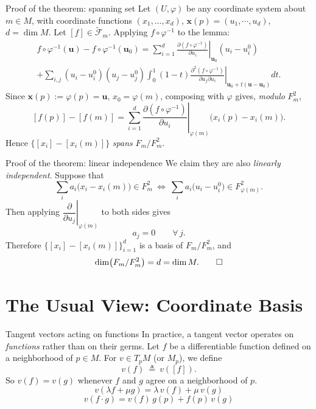 \documentclass[10pt]{beamer}
\newcommand{\F}{\mathcal{F}}
\begin{document}
\begin{frame}{Proof of the theorem: spanning set}
	Let $(U, \varphi)$ be any coordinate system about $m \in M$, with
	coordinate functions $(x_1, \dots, x_d)$, $\mathbf{x}(p) =(u_1,\cdots, u_d)$, $d = \dim M$. Let
	$[f] \in \widetilde{\F}_m$. Applying $f \circ \varphi^{-1}$ to the
	lemma:
	\begin{multline*}
		f \circ \varphi^{-1}(\mathbf{u}) - f \circ \varphi^{-1}(\mathbf{u}_0)
		= \sum_{i=1}^{d}
		\left. \frac{\partial (f \circ \varphi^{-1})}{\partial u_i}
		\right|_{\mathbf{u}_0} (u_i - u_i^0) \\
		+ \sum_{i,j} (u_i - u_i^0)(u_j - u_j^0) \int_0^1 (1-t)
		\left. \frac{\partial^2 (f \circ \varphi^{-1})}
		{\partial u_j \partial u_i} \right|_{\mathbf{u}_0 + t(\mathbf{u} - \mathbf{u}_0)} dt .
	\end{multline*}
	Since $\mathbf{x}(p) := \varphi(p)=\mathbf{u}$, $x_0 = \varphi(m)$, composing with $\varphi$
	gives, \emph{modulo} $F_m^2$,
	\[
		[f(p)] - [f(m)]
		= \sum_{i=1}^{d}
		\left. \frac{\partial (f \circ \varphi^{-1})}{\partial u_i}
		\right|_{\varphi(m)} \bigl(x_i(p) - x_i(m)\bigr).
	\]
	Hence $\bigl\{ [x_i] - [x_i(m)] \bigr\}$ \emph{spans} $F_m / F_m^2$.
\end{frame}

\begin{frame}{Proof of the theorem: linear independence}
	We claim they are also \emph{linearly independent}. Suppose that
	\[
		\sum_i a_i \bigl(x_i - x_i(m)\bigr) \in F_m^2
		\ \Longleftrightarrow\
		\sum_i a_i \bigl(u_i - u_i^0\bigr) \in F_{\varphi(m)}^2 .
	\]
	Then applying $\left. \dfrac{\partial}{\partial u_j}
		\right|_{\varphi(m)}$ to both sides gives
	\[
		a_j = 0 \qquad \forall\, j .
	\]
	Therefore $\bigl\{ [x_i] - [x_i(m)] \bigr\}_{i=1}^{d}$ is a basis of
	$F_m / F_m^2$, and
	\[
		\dim\bigl(F_m / F_m^2\bigr) = d = \dim M . \qed
	\]
\end{frame}

\section{The Usual View: Coordinate Basis}

\begin{frame}{Tangent vectors acting on functions}
	In practice, a tangent vector operates on \emph{functions} rather than
	on their germs. Let $f$ be a differentiable function defined on a
	neighborhood of $p \in M$. For $v \in T_p M$ (or $M_p$), we define
	\[
		v(f) \ \triangleq\ v([f]).
	\]
	So $v(f) = v(g)$ whenever $f$ and $g$ agree on a neighborhood of $p$.
	\[
		v(\lambda f + \mu g) = \lambda\, v(f) + \mu\, v(g)
		\tag{a}
	\]
	\[
		v(f \cdot g) = v(f)\, g(p) + f(p)\, v(g)
		\tag{b}
	\]
\end{frame}
\end{document}

